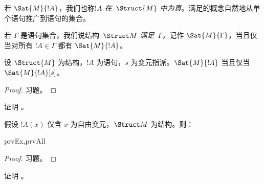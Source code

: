 \documentclass[../../../include/open-logic-section]{subfiles}
\begin{document}
若 $\Sat{M}{!A}$，我们也称\emph{$!A$ 在~$\Struct{M}$ 中为真}。满足的概念自然地从单个语句推广到语句的集合。

\begin{defn}
若 $\Gamma$ 是语句集合，我们说结构~$\Struct M$ \emph{满足}~$\Gamma$，记作 $\Sat{M}{\Gamma}$，当且仅当对所有 $!A \in \Gamma$ 都有 $\Sat{M}{!A}$。
\end{defn}

\begin{prop}
  设 $\Struct{M}$ 为结构，$!A$ 为语句，$s$ 为变元指派。$\Sat{M}{!A}$ 当且仅当 $\Sat{M}{!A}[s]$。
\end{prop}

\begin{proof}
习题。
\end{proof}

\begin{prob}
证明 。
\end{prob}

\begin{prop}
  假设 $!A(x)$ 仅含 $x$ 为自由变元，$\Struct M$ 为结构。则：
  \begin{tagenumerate}{prvEx,prvAll}
\end{tagenumerate}
\end{prop}

\begin{proof}
习题。
\end{proof}

\begin{prob}
证明 。
\end{prob}
\end{document}
